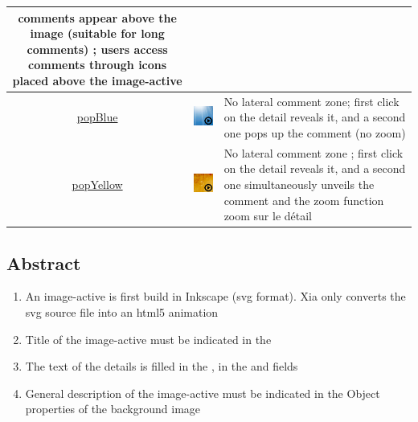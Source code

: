 {\begin{center}
\begin{tabular}{|c|c|p{3in}|}
comments appear above the image (suitable for long comments) ; users access  
comments through icons placed above the image-active \\
\hline
\href{http://geoffrey-gekiere.ac-versailles.fr/xia1/popBlue}{popBlue} & 
\includegraphics[scale=0.5]{./images/popBlue} & No lateral comment zone; 
first click on the detail reveals it, and a second one pops up the comment 
(no zoom) \\
\hline
\href{http://geoffrey-gekiere.ac-versailles.fr/xia1/popYellow}{popYellow} & 
\includegraphics[scale=0.5]{./images/popYellow} & No lateral comment zone ; 
first click on the detail reveals it, and a second one simultaneously unveils 
the comment and the zoom function zoom sur le détail\\
\hline
\end{tabular}
\end{center}

\subsection{Abstract}

\begin{enumerate}
 \item An image-active is first build in Inkscape (svg format). Xia only 
 converts the svg source file into an html5 animation
 \item Title of the image-active must be indicated in the 
 \item The text of the details is filled in the , 
 in the  and  fields
 \item General description of the image-active must be indicated in the \chemin
{Object properties} of the background image
\end{enumerate}

}
